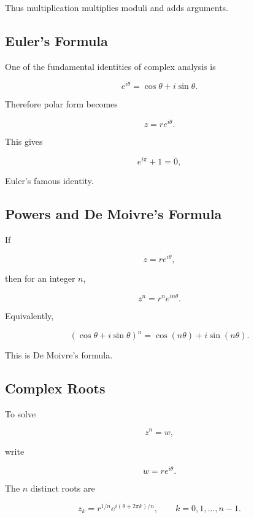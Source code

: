 Thus multiplication multiplies moduli and adds arguments.

\subsection{Euler's Formula}
\label{subsec:eulers-formula-complex}

One of the fundamental identities of complex analysis is

\[
\boxed{
e^{i\theta}
=
\cos\theta+i\sin\theta.
}
\]

Therefore polar form becomes

\[
\boxed{
z=re^{i\theta}.
}
\]

This gives

\[
\boxed{
e^{i\pi}+1=0,
}
\]

Euler's famous identity.

\subsection{Powers and De Moivre's Formula}
\label{subsec:de-moivre}

If

\[
z=re^{i\theta},
\]

then for an integer \(n\),

\[
\boxed{
z^n
=
r^ne^{in\theta}.
}
\]

Equivalently,

\[
\boxed{
(\cos\theta+i\sin\theta)^n
=
\cos(n\theta)+i\sin(n\theta).
}
\]

This is De Moivre's formula.

\subsection{Complex Roots}
\label{subsec:complex-roots}

To solve

\[
z^n=w,
\]

write

\[
w=re^{i\theta}.
\]

The \(n\) distinct roots are

\[
\boxed{
z_k
=
r^{1/n}
e^{i(\theta+2\pi k)/n},
\qquad
k=0,1,\ldots,n-1.
}
\]

